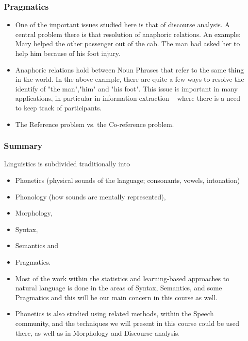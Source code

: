\begin{frame}[fragile]
 \frametitle{Pragmatics}
 \begin{itemize}
 \item One of the important issues studied here is that of discourse analysis. 
A central problem there is that resolution of anaphoric relations.
An example:
Mary helped the other passenger out of the cab. The man had asked her to help him because of his foot injury. 

\item Anaphoric relations hold between Noun Phrases that refer to the same thing in the world. 
In the above example, there are quite a few ways to resolve the identify of "the man","him" and "his foot".
This issue is important in many applications, in particular in information extraction -- where there is a need to keep track of participants.
\item The Reference problem vs. the Co-reference problem.


 \end{itemize}
\end{frame}

\begin{frame}[fragile]
 \frametitle{Summary}
 Linguistics is subdivided traditionally into 

 \begin{itemize}
 \item Phonetics (physical sounds of the language; consonants, vowels, intonation)
 \item Phonology (how sounds are mentally represented), 
 \item Morphology,
 \item Syntax, 
 \item Semantics and  
 \item Pragmatics.
 \item Most of the work within the statistics and learning-based approaches to natural language is done in the areas of Syntax, Semantics, and some Pragmatics and this will be our main concern in this course as well. 
 \item Phonetics is also studied using related methods, within the Speech community, and the techniques we will present in this course could be used there, as well as in Morphology and Discourse analysis.
 \end{itemize}
\end{frame}



